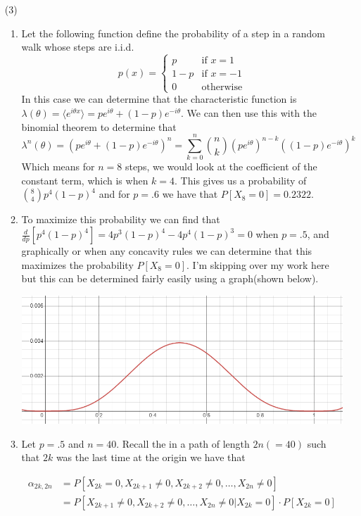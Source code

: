 \documentclass[12pt]{amsart}
\theoremstyle{definition}
\newcommand{\ip}[1]{\langle#1\rangle}
\begin{document}
\begin{itemize}
\begin{enumerate}[label=(\alph*)]
    \item[(3)]
    \begin{enumerate}[label=(\alph*)]
        \item Let the following function define the probability of a step in a random walk whose steps are i.i.d.
    $$
p(x)=
    \begin{cases}
        p & \text{if } x=1\\
        1-p & \text{if } x=-1\\
        0 & \text{otherwise} 
    \end{cases}$$
In this case we can determine that the characteristic function is $\lambda(\theta)=\ip{e^{i\theta x}}=pe^{i\theta}+(1-p)e^{-i\theta}$. We can then use this with the binomial theorem to determine that 
$$\lambda^n(\theta)=\left(pe^{i\theta}+(1-p)e^{-i\theta}\right)^n=\sum_{k=0}^n {n \choose k} (pe^{i\theta})^{n-k}((1-p)e^{-i\theta})^k$$
Which means for $n=8$ steps, we would look at the coefficient of the constant term, which is when $k=4$. This gives us a probability of ${8\choose 4}p^4(1-p)^4$ and for $p=.6$ we have that $P[X_8=0]=0.2322$.\\

\item To maximize this probability we can find that $\frac{d}{dp}\left[p^4(1-p)^4\right]=4p^3\left(1-p\right)^4-4p^4\left(1-p\right)^3=0$ when $p=.5$, and graphically or when any concavity rules we can determine that this maximizes the probability $P[X_8=0]$. I'm skipping over my work here but this can be determined fairly easily using a graph(shown below).

\includegraphics[scale=.5]{maximum_thing.png}
\\

\item Let $p=.5$ and $n=40$. Recall the in a path of length $2n(=40)$ such that $2k$ was the last time at the origin we have that 

\begin{align*}
    \alpha_{2k,2n}&=P[X_{2k}=0,X_{2k+1}\neq 0,X_{2k+2}\neq 0,\dots,X_{2n}\neq 0]\\
    &=P[X_{2k+1}\neq 0,X_{2k+2}\neq 0,\dots,X_{2n}\neq 0|X_{2k}=0]\cdot P[X_{2k}=0]
\end{align*}


\end{enumerate}
\end{enumerate}
\end{itemize}
\end{document}
